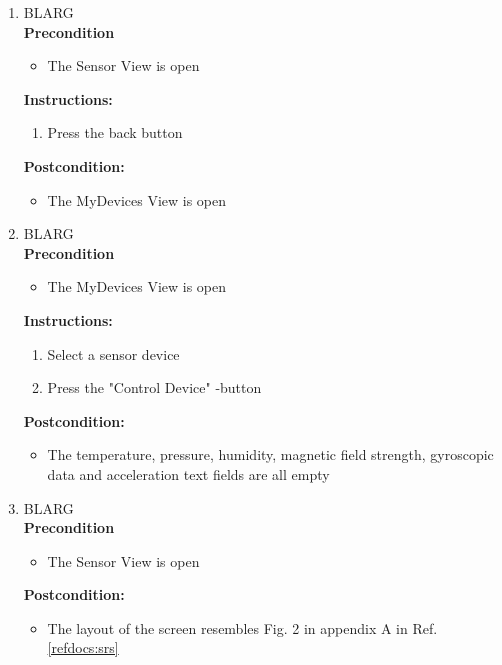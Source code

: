 \documentclass[a4paper]{article}
\newlength{\testlabellength}
\newenvironment{testlist}{\begin{enumerate}[label=\bfseries Instruction \thesubsection.\arabic* , labelindent=0pt, labelwidth=\testlabellength , leftmargin=2cm]}{\end{enumerate}}
\newenvironment{precondition}{
{\color{white}BLARG}\\ 
\textbf{Precondition}
\begin{itemize}[labelindent=0cm, labelwidth=2cm , leftmargin=1cm]
}
{\end{itemize}}
\newenvironment{instruction}{
\textbf{Instructions:}
\begin{enumerate}[label=\bfseries  \arabic*., labelindent=0cm, labelwidth=2cm , leftmargin=1cm]
}
{\end{enumerate}}
\newenvironment{postcondition}{
\textbf{Postcondition:}
\begin{itemize}[labelindent=0cm, labelwidth=2cm , leftmargin=1cm]
}
{\end{itemize}}
\begin{document}
\begin{appendices}
\begin{testlist}

	\item
		\begin{precondition}
			\item The Sensor View is open
		\end{precondition}
		\begin{instruction}
			\item Press the back button
		\end{instruction}
		\begin{postcondition}
			\item The MyDevices View is open
		\end{postcondition}


	\item
		\begin{precondition}
			\item The MyDevices View is open
		\end{precondition}
		\begin{instruction}			
			\item Select a sensor device
			\item Press the "Control Device" -button
		\end{instruction}
		\begin{postcondition}
			\item The temperature, pressure, humidity, magnetic field strength, gyroscopic data and acceleration text fields are all empty
		\end{postcondition}


	\item
		\begin{precondition}
			\item The Sensor View is open
		\end{precondition}
		\begin{postcondition}
			\item The layout of the screen resembles Fig. 2 in appendix A in Ref. \ref{refdocs:srs}
		\end{postcondition}
\end{testlist}


\end{appendices}
\end{document}
